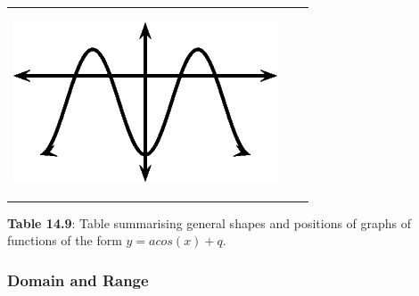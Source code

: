 \begin{center}
\begin{xtabular*}{\mytablewidth}[t]{|p{10\mystarwidth}|p{10\mystarwidth}|p{10\mystarwidth}|}
        
                  
    \setcounter{subfigure}{0}

\label{m39414*id88246}
    \begin{center}
    \label{m39414*id88246!!!underscore!!!media}\label{m39414*id88246!!!underscore!!!printimage}\includegraphics{col11306.imgs/m39414_MG10C15_029.png} %
        
      \vspace{2pt}
    \vspace{.1in}
    
    \end{center}



    \addtocounter{footnote}{-0}
    
     \tabularnewline{}
    \end{xtabular*}
      \end{center}
    \begin{center}{\small\bfseries Table 14.9}: Table summarising general shapes and positions of graphs of functions of the form \begin{math}y=acos\left(x\right)+q\end{math}.\end{center}
    
    \addtocounter{footnote}{-0}
    
    \par
  
        \label{m39414*uid66}
            \subsubsection{ Domain and Range}
            \nopagebreak
            
